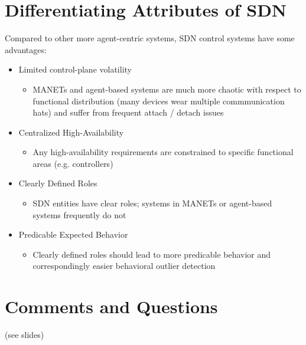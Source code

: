 \documentclass[12pt,letterpaper]{article}
\begin{document}
\section{Differentiating Attributes of SDN}
Compared to other more agent-centric systems, SDN control systems have some advantages:
\begin{itemize}
\item Limited control-plane volatility
	\begin{itemize}
	\item MANETs and agent-based systems are much more chaotic with respect to functional distribution (many devices wear multiple commmunication hats) and suffer from frequent attach / detach issues
	\end{itemize}
\item Centralized High-Availability
	\begin{itemize}
	\item Any high-availability requirements are constrained to specific functional areas (e.g. controllers)
	\end{itemize}
\item Clearly Defined Roles
	\begin{itemize}
	\item SDN entities have clear roles; systems in MANETs or agent-based systems frequently do not
	\end{itemize}
\item Predicable Expected Behavior
	\begin{itemize}
	\item Clearly defined roles should lead to more predicable behavior and correspondingly easier behavioral outlier detection
	\end{itemize}
\end{itemize}

\section{Comments and Questions}
(see slides)
\end{document}
